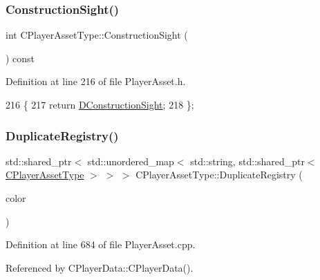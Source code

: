 \subsubsection{\texorpdfstring{Construction\+Sight()}{ConstructionSight()}}
{\footnotesize\ttfamily int C\+Player\+Asset\+Type\+::\+Construction\+Sight (\begin{DoxyParamCaption}{ }\end{DoxyParamCaption}) const\hspace{0.3cm}{\ttfamily [inline]}}



Definition at line 216 of file Player\+Asset.\+h.


\begin{DoxyCode}
216                                      \{
217             \textcolor{keywordflow}{return} \hyperlink{classCPlayerAssetType_a71b34081d4540087472af3cb9052e04a}{DConstructionSight};  
218         \};
\end{DoxyCode}
\hypertarget{classCPlayerAssetType_a6dfbccbbed7fecec6b7e2c51ac22fe5a}{}\label{classCPlayerAssetType_a6dfbccbbed7fecec6b7e2c51ac22fe5a} 
\subsubsection{\texorpdfstring{Duplicate\+Registry()}{DuplicateRegistry()}}
{\footnotesize\ttfamily std\+::shared\+\_\+ptr$<$ std\+::unordered\+\_\+map$<$ std\+::string, std\+::shared\+\_\+ptr$<$ \hyperlink{classCPlayerAssetType}{C\+Player\+Asset\+Type} $>$ $>$ $>$ C\+Player\+Asset\+Type\+::\+Duplicate\+Registry (\begin{DoxyParamCaption}\item[{\hyperlink{GameDataTypes_8h_aafb0ca75933357ff28a6d7efbdd7602f}{E\+Player\+Color}}]{color }\end{DoxyParamCaption})\hspace{0.3cm}{\ttfamily [static]}}



Definition at line 684 of file Player\+Asset.\+cpp.



Referenced by C\+Player\+Data\+::\+C\+Player\+Data().


